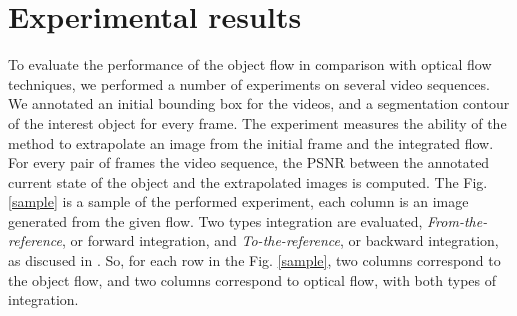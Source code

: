 \section{Experimental results}
   \vspace*{-0.5cm}
To evaluate the performance of the object flow in comparison with optical flow techniques, we performed 
a number of experiments on several video sequences. We annotated an initial bounding box for the videos, 
and a segmentation contour of the interest object for every frame. The experiment measures the ability of the method to 
extrapolate an image from the initial frame and the integrated flow. For every pair of frames the video sequence, the PSNR between the annotated
current state of the object and the extrapolated images is computed. The Fig. \ref{sample} is a sample of the performed experiment, each column is an image generated from the given flow. 
Two types integration are evaluated, {\it From-the-reference}, or forward integration, and {\it To-the-reference}, or backward integration, as discused in \cite{c20}. So, for each row in the Fig. \ref{sample}, 
two columns correspond to the object flow, and two columns correspond to optical flow, with both types of integration.

